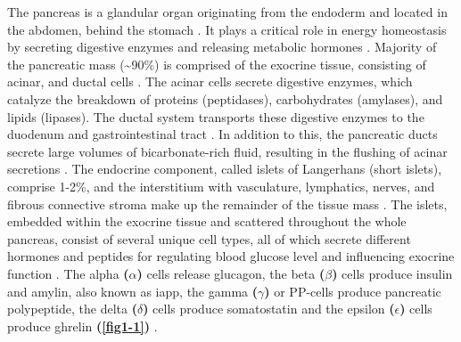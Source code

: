 The pancreas is a glandular organ originating from the endoderm and located in the abdomen, behind the stomach \textbf{\cite{shih_pancreas_2013}}. It plays a critical role in energy homeostasis by secreting digestive enzymes and releasing metabolic hormones \textbf{\cite{kimmel_molecular_2010, baron_single-cell_2016}}. Majority of the pancreatic mass (\textasciitilde 90\%) is comprised of the exocrine tissue, consisting of acinar, and ductal cells \textbf{\cite{pandiri_overview_2014}}. The acinar cells secrete digestive enzymes, which catalyze the breakdown of proteins (peptidases), carbohydrates (amylases), and lipids (lipases). The ductal system transports these digestive enzymes to the duodenum and gastrointestinal tract \textbf{\cite{shih_pancreas_2013, baron_single-cell_2016}}.  In addition to this, the pancreatic ducts secrete large volumes of bicarbonate-rich fluid, resulting in the flushing of acinar secretions \textbf{\cite{pandiri_overview_2014, low_pancreatic_2010}}. The endocrine component, called islets of Langerhans (short islets), comprise 1-2\%, and the interstitium with vasculature, lymphatics, nerves, and fibrous connective stroma make up the remainder of the tissue mass \textbf{\cite{pandiri_overview_2014}}. The islets, embedded within the exocrine tissue and scattered throughout the whole pancreas, consist of several unique cell types, all of which secrete different hormones and peptides for regulating blood glucose level and influencing exocrine function \textbf{\cite{shih_pancreas_2013, baron_single-cell_2016}}. The alpha \textbf{($\alpha$)} cells release glucagon, the beta \textbf{($\beta$)} cells produce insulin and amylin, also known as \gls{iapp}, the gamma \textbf{($\gamma$)} or PP-cells produce pancreatic polypeptide, the delta \textbf{($\delta$)} cells produce somatostatin and the epsilon \textbf{($\epsilon$)} cells produce ghrelin \textbf{(\autoref{fig1-1})} \textbf{\cite{mastracci_endocrine_2012}}.\\

